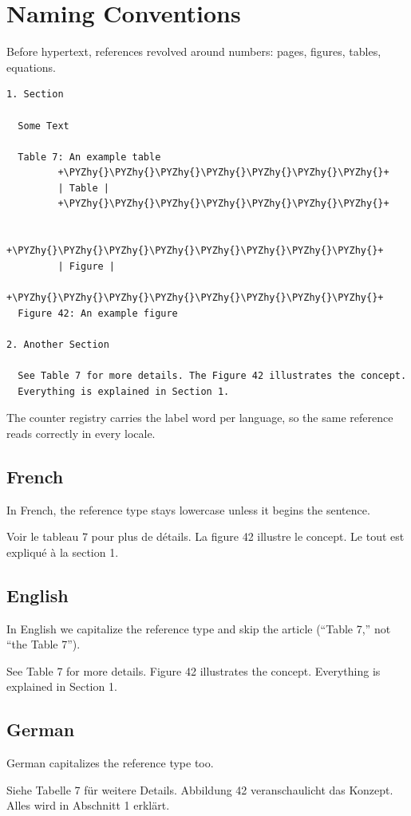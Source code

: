 \documentclass[a4paper,twoside]{article}
\begin{document}
\section{Naming Conventions}
Before hypertext, references revolved around numbers: pages, figures, tables, equations.
\begin{tscode}[lang=text, engine=pygments]
\begin{Verbatim}[commandchars=\\\{\},breaklines, breakanywhere, commandchars=\\\{\}]
1. Section

  Some Text

  Table 7: An example table
         +\PYZhy{}\PYZhy{}\PYZhy{}\PYZhy{}\PYZhy{}\PYZhy{}\PYZhy{}+
         | Table |
         +\PYZhy{}\PYZhy{}\PYZhy{}\PYZhy{}\PYZhy{}\PYZhy{}\PYZhy{}+

         +\PYZhy{}\PYZhy{}\PYZhy{}\PYZhy{}\PYZhy{}\PYZhy{}\PYZhy{}\PYZhy{}+
         | Figure |
         +\PYZhy{}\PYZhy{}\PYZhy{}\PYZhy{}\PYZhy{}\PYZhy{}\PYZhy{}\PYZhy{}+
  Figure 42: An example figure

2. Another Section

  See Table 7 for more details. The Figure 42 illustrates the concept.
  Everything is explained in Section 1.
\end{Verbatim}
\end{tscode}
The counter registry carries the label word per language, so the same 
reference reads correctly in every locale.
\subsection{French}
In French, the reference type stays lowercase unless it begins the sentence.
\begin{displayquote}
Voir le tableau 7 pour plus de détails. La figure 42 illustre le concept.
Le tout est expliqué à la section 1.
\end{displayquote}
\subsection{English}
In English we capitalize the reference type and skip the article (``Table 7,'' not ``the Table 7'').
\begin{displayquote}
See Table 7 for more details. Figure 42 illustrates the concept.
Everything is explained in Section 1.
\end{displayquote}
\subsection{German}
German capitalizes the reference type too.
\begin{displayquote}
Siehe Tabelle 7 für weitere Details. Abbildung 42 veranschaulicht das Konzept.
Alles wird in Abschnitt 1 erklärt.
\end{displayquote}
\end{document}
